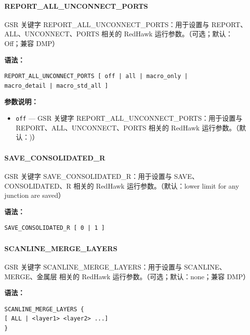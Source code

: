 \paragraph*{REPORT_ALL_UNCONNECT_PORTS}

GSR 关键字 REPORT_ALL_UNCONNECT_PORTS：用于设置与 REPORT、ALL、UNCONNECT、PORTS 相关的 RedHawk 运行参数。（可选；默认：Off；兼容 DMP）

\textbf{语法：}
\begin{lstlisting}
REPORT_ALL_UNCONNECT_PORTS [ off | all | macro_only |
macro_detail | macro_std_all ]
\end{lstlisting}

\textbf{参数说明：}
\begin{itemize}
\item \texttt{off} — GSR 关键字 REPORT\_ALL\_UNCONNECT\_PORTS：用于设置与 REPORT、ALL、UNCONNECT、PORTS 相关的 RedHawk 运行参数。（默认：)）
\end{itemize}

\subsubsection{}
\paragraph*{SAVE_CONSOLIDATED_R}

GSR 关键字 SAVE_CONSOLIDATED_R：用于设置与 SAVE、CONSOLIDATED、R 相关的 RedHawk 运行参数。（默认：lower limit for any junction are saved）

\textbf{语法：}
\begin{lstlisting}
SAVE_CONSOLIDATED_R [ 0 | 1 ]
\end{lstlisting}

\subsubsection{}
\paragraph*{SCANLINE_MERGE_LAYERS}

GSR 关键字 SCANLINE_MERGE_LAYERS：用于设置与 SCANLINE、MERGE、金属层 相关的 RedHawk 运行参数。（可选；默认：none；兼容 DMP）

\textbf{语法：}
\begin{lstlisting}
SCANLINE_MERGE_LAYERS {
[ ALL | <layer1> <layer2> ...]
}
\end{lstlisting}

